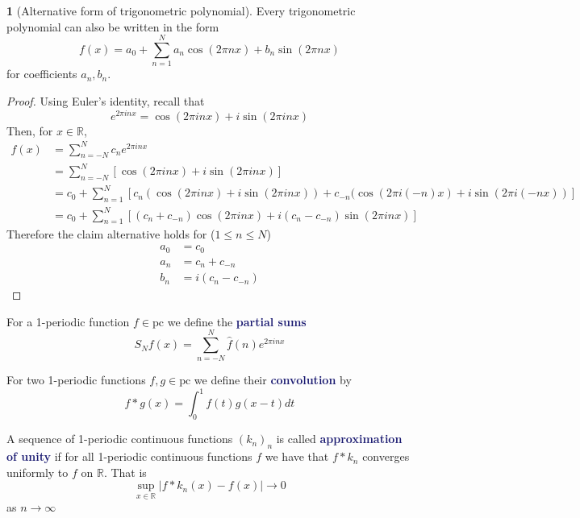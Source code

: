 \documentclass[11pt]{article}
\numberwithin{equation}{section}
\newcommand{\navy}[1]{\textcolor{MidnightBlue}{\bf #1}}
\theoremstyle{definition}
\newtheorem{claim}{\color{ForestGreen}{\textbf{Claim}}}[section]
\theoremstyle{definition}
\newcommand\squares[1]{\left[ #1 \right]}
\newcommand\abs[1]{\left| #1 \right|}
\newcommand{\1}{\mathbbm 1}
\newcommand{\RR}{\mathbb R}
\begin{document}
\begin{claim}[Alternative form of trigonometric polynomial]
	Every trigonometric polynomial can also be written in the form
	\begin{equation}
		f(x) = a_0 + \sum_{n=1}^N a_n \cos(2\pi n x) + b_n \sin(2\pi nx)
	\end{equation}
	for coefficients $a_n, b_n$. 
\end{claim}
\begin{proof}
	Using Euler's identity, recall that
	\begin{equation}
		e^{2\pi i n x} = \cos(2\pi i n x) + i \sin(2\pi i n x)
	\end{equation}
	Then, for $x \in \RR$,
	\begin{align*}
		f(x) &= \sum_{n=-N}^N c_n e^{2\pi i n x} \\
		&= \sum_{n=-N}^N \squares{\cos(2\pi i n x) + i \sin(2\pi i n x)} \\
		&= c_0 + \sum_{n=1}^N \squares{c_n(\cos(2\pi i n x) + i \sin(2\pi i n x)) + c_{-n}(\cos(2\pi i (-n) x) + i \sin(2\pi i (-n x))} \\
		&= c_0 + \sum_{n=1}^N \squares{(c_n + c_{-n})\cos(2\pi i n x) + i(c_n - c_{-n})\sin(2\pi i n x)}
	\end{align*}
	Therefore the claim alternative holds for ($1 \leq n \leq N$)
	\begin{align*}
		a_0 &= c_0 \\
		a_n &= c_n + c_{-n} \\
		b_n &= i(c_n - c_{-n})
	\end{align*}
	
\end{proof}

\begin{definition}
	For a 1-periodic function $f \in \text{pc}$ we define the \navy{partial sums} 
	\begin{equation}
		S_Nf(x) = \sum_{n=-N}^N \hat{f}(n) e^{2\pi i nx}
	\end{equation}
\end{definition}

\begin{definition}[Convolution]
	For two 1-periodic functions $f,g \in \text{pc}$ we define their \navy{convolution} by
	\begin{equation}
		f * g(x) = \int_0^1 f(t)g(x-t)dt
	\end{equation}
\end{definition}


\begin{definition}
	A sequence of 1-periodic continuous functions $(k_n)_n$ is called \navy{approximation of unity} if for all 1-periodic continuous functions $f$ we have that $f * k_n$ converges uniformly to $f$ on $\RR$. That is
	\begin{equation}
		\sup_{x \in \RR} \abs{f * k_n(x) - f(x)} \to 0
	\end{equation}
	as $n \to \infty$
\end{definition}
\end{document}
